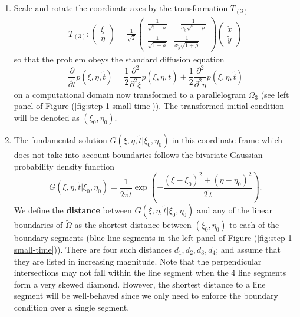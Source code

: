 \begin{enumerate}
\item Scale and rotate the coordinate axes by the transformation
  $T_{(3)}$
  \begin{align}
    T_{(3)}: \left( \begin{array}{c}
             \xi \\
             \eta
           \end{array} \right) = \frac{1}{\sqrt{2}}
         \left( \begin{array}{cc}
                  \frac{1}{ \sqrt{1-\rho}} & -\frac{1}{\sigma_{\tilde{y}}\sqrt{1-\rho}}\\
                  \frac{1}{ \sqrt{1+\rho}} & \frac{1}{\sigma_{\tilde{y}}\sqrt{1+\rho}}
                \end{array} \right)
             \left( \begin{array}{cc}
             \tilde{x} \\
                      \tilde{y}
           \end{array} \right) \label{eq:T3}
       \end{align}
       so that the problem obeys the standard diffusion equation
       \[
         \frac{\partial }{\partial \tilde{t}}p(\xi,\eta,\tilde{t}) =
         \frac{1}{2}\frac{\partial^2 }{\partial^2 \xi} p(\xi,\eta,\tilde{t})+
         \frac{1}{2}\frac{\partial^2 }{\partial^2 \eta} p(\xi,\eta,\tilde{t})
       \]
       on a computational domain now transformed to a parallelogram
       $\Omega_3$ (see left panel of Figure
       (\ref{fig:step-1-small-time})). The transformed initial
       condition will be denoted as $(\xi_0, \eta_0)$.

     \item The fundamental solution
       $G(\xi,\eta,\tilde{t} | \xi_0, \eta_0)$ in this coordinate
       frame which does not take into account boundaries follows the
       bivariate Gaussian probability density function
  \[
    G(\xi,\eta,\tilde{t} | \xi_0, \eta_0) = \frac{1}{2\pi \tilde{t}} \exp\left(-\frac{(\xi-\xi_0)^2 +
        (\eta-\eta_0)^2}{2\,\tilde{t}} \right).
  \]
  We define the \textbf{distance} between
  $G(\xi,\eta,\tilde{t} | \xi_0, \eta_0)$ and any of the linear boundaries of
  $\tilde{\Omega}$ as the shortest distance between $(\xi_0, \eta_0)$
  to each of the boundary segments (blue line segments in the left
  panel of Figure (\ref{fig:step-1-small-time})).  There are four such
  distances $d_1, d_2, d_3, d_4$; and assume that they are listed in
  increasing magnitude. Note that the perpendicular intersections may
  not fall within the line segment when the 4 line segments form a
  very skewed diamond. However, the shortest distance to a line
  segment will be well-behaved since we only need to enforce the
  boundary condition over a single segment.


\end{enumerate}

